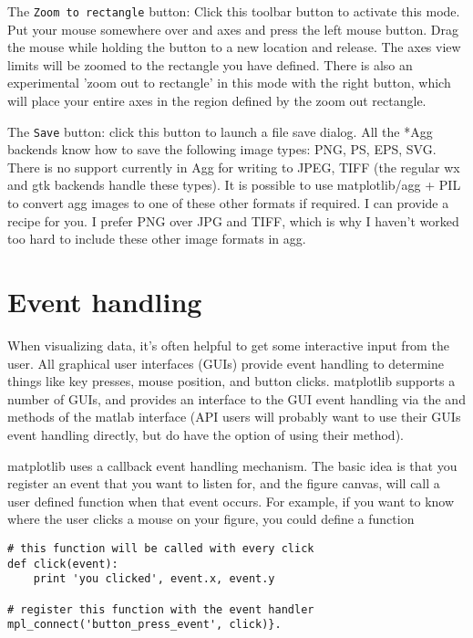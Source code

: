 \documentclass[]{book}
\begin{document}
The \texttt{Zoom to rectangle} button: Click this toolbar button to
activate this mode.  Put your mouse somewhere over and axes and press
the left mouse button.  Drag the mouse while holding the button to a
new location and release.  The axes view limits will be zoomed to the
rectangle you have defined.  There is also an experimental 'zoom out
to rectangle' in this mode with the right button, which will place
your entire axes in the region defined by the zoom out rectangle.

The \texttt{Save} button: click this button to launch a file save
dialog.  All the *Agg backends know how to save the following image
types: PNG, PS, EPS, SVG.  There is no support currently in Agg for
writing to JPEG, TIFF (the regular wx and gtk backends handle these
types).  It is possible to use matplotlib/agg + PIL to convert agg
images to one of these other formats if required.  I can provide a
recipe for you.  I prefer PNG over JPG and TIFF, which is why I
haven't worked too hard to include these other image formats in agg.



\section{Event handling}
\label{sec:events}

When visualizing data, it's often helpful to get some interactive
input from the user.  All graphical user interfaces (GUIs) provide
event handling to determine things like key presses, mouse position,
and button clicks.  matplotlib supports a number of GUIs, and provides
an interface to the GUI event handling via the  and
 methods of the matlab interface (API users will
probably want to use their GUIs event handling directly, but do have
the option of using their  method).

matplotlib uses a callback event handling mechanism.  The basic idea
is that you register an event that you want to listen for, and the
figure canvas, will call a user defined function when that event
occurs.  For example, if you want to know where the user clicks a
mouse on your figure, you could define a function

\begin{lstlisting}
# this function will be called with every click
def click(event):
    print 'you clicked', event.x, event.y

# register this function with the event handler
mpl_connect('button_press_event', click)}.  
\end{lstlisting}
\end{document}
